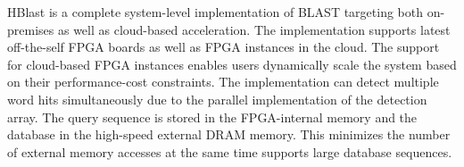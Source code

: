 HBlast is a complete system-level implementation of BLAST targeting both on-premises as well as cloud-based acceleration.
The implementation supports latest off-the-self FPGA boards as well as FPGA instances in the cloud.
The support for cloud-based FPGA instances enables users dynamically scale the system based on their performance-cost constraints.
The implementation can detect multiple word hits simultaneously due to the parallel implementation of the detection array.
The query sequence is stored in the FPGA-internal memory and the database in the high-speed external DRAM memory.
This minimizes the number of external memory accesses at the same time supports large database sequences.
